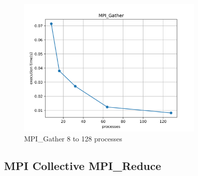 \documentclass[12pt]{article}
\begin{document}
\begin{figure}[H]
  \centering
  \includegraphics[width=0.8\textwidth]{graph-pi-mpi-gather.png}
  \caption{MPI\_Gather 8 to 128 processes}
  \label{fig:blocking}
\end{figure}

\subsection{MPI Collective MPI\_Reduce}
\end{document}
